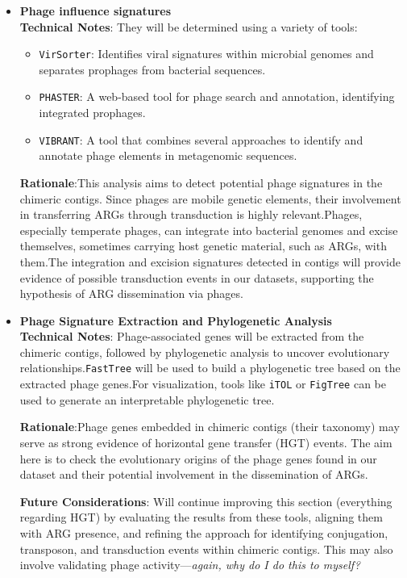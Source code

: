 \documentclass[11pt]{report}
\begin{document}
\begin{itemize}
\item \textbf{Phage influence signatures}\\
\textbf{Technical Notes}: They will be determined using a variety of tools:
\begin{itemize}
	\item \texttt{VirSorter}: Identifies viral signatures within microbial genomes and separates prophages from bacterial sequences.
	\item \texttt{PHASTER}: A web-based tool for phage search and annotation, identifying integrated prophages.
	\item \texttt{VIBRANT}: A tool that combines several approaches to identify and annotate phage elements in metagenomic sequences.
\end{itemize}



\textbf{Rationale}:This analysis aims to detect potential phage signatures in the chimeric contigs. Since phages are mobile genetic elements, their involvement in transferring ARGs through transduction is highly relevant.Phages, especially temperate phages, can integrate into bacterial genomes and excise themselves, sometimes carrying host genetic material, such as ARGs, with them.The integration and excision signatures detected in contigs will provide evidence of possible transduction events in our datasets, supporting the hypothesis of ARG dissemination via phages.


\item \textbf{Phage Signature Extraction and Phylogenetic Analysis}\\
\textbf{Technical Notes}: Phage-associated genes will be extracted from the chimeric contigs, followed by phylogenetic analysis to uncover evolutionary relationships.\texttt{FastTree} will be used to build a phylogenetic tree based on the extracted phage genes.For visualization, tools like \texttt{iTOL} or \texttt{FigTree} can be used to generate an interpretable phylogenetic tree.


\textbf{Rationale}:Phage genes embedded in chimeric contigs (their taxonomy) may serve as strong evidence of horizontal gene transfer (HGT) events. The aim here is to check the evolutionary origins of the phage genes found in our dataset and their potential involvement in the dissemination of ARGs.


\textbf{Future Considerations}: 
Will continue improving this section (everything regarding HGT) by evaluating the results from these tools, aligning them with ARG presence, and refining the approach for identifying conjugation, transposon, and transduction events within chimeric contigs. This may also involve validating phage activity—\textit{again, why do I do this to myself?}

\end{itemize}
\end{document}

